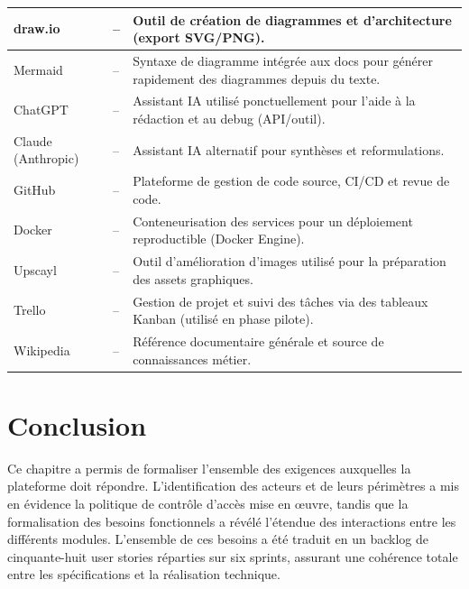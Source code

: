 \begin{table}[H]
\begin{tabular}{|p{3cm}|p{2.5cm}|p{7.8cm}|}
        \hline
        draw.io & --
        & Outil de création de diagrammes et d'architecture (export SVG/PNG). \\
        \hline
        Mermaid & --
        & Syntaxe de diagramme intégrée aux docs pour générer rapidement des diagrammes depuis du texte. \\
        \hline
        ChatGPT & --
        & Assistant IA utilisé ponctuellement pour l'aide à la rédaction et au debug (API/outil). \\
        \hline
        Claude (Anthropic) & --
        & Assistant IA alternatif pour synthèses et reformulations. \\
        \hline
        GitHub & --
        & Plateforme de gestion de code source, CI/CD et revue de code. \\
        \hline
        Docker & --
        & Conteneurisation des services pour un déploiement reproductible (Docker Engine). \\
        \hline
        Upscayl & --
        & Outil d'amélioration d'images utilisé pour la préparation des assets graphiques. \\
        \hline
        Trello & --
        & Gestion de projet et suivi des tâches via des tableaux Kanban (utilisé en phase pilote). \\
        \hline
        Wikipedia & --
        & Référence documentaire générale et source de connaissances métier. \\
        \hline
    \end{tabular}
\end{table}

\section{Conclusion}

Ce chapitre a permis de formaliser l'ensemble des exigences auxquelles la plateforme doit répondre. L'identification des acteurs et de leurs périmètres a mis en évidence la politique de contrôle d'accès mise en œuvre, tandis que la formalisation des besoins fonctionnels a révélé l'étendue des interactions entre les différents modules. L'ensemble de ces besoins a été traduit en un backlog de cinquante-huit user stories réparties sur six sprints, assurant une cohérence totale entre les spécifications et la réalisation technique.
